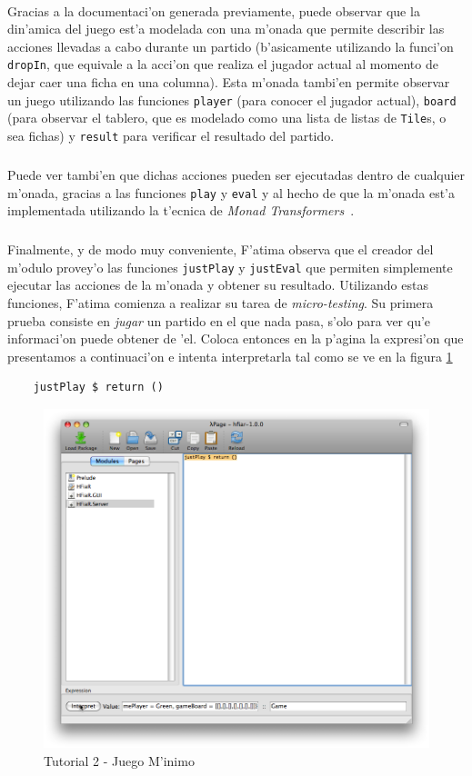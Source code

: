 \documentclass[a4paper]{article}
\begin{document}
\paragraph{}Gracias a la documentaci'on generada previamente, puede observar que la din'amica del juego est'a modelada con una m'onada que permite describir las acciones llevadas a cabo durante un partido (b'asicamente utilizando la funci'on \texttt{dropIn}, que equivale a la acci'on que realiza el jugador actual al momento de dejar caer una ficha en una columna).  Esta m'onada tambi'en permite observar un juego utilizando las funciones \texttt{player} (para conocer el jugador actual), \texttt{board} (para observar el tablero, que es modelado como una lista de listas de \texttt{Tile}s, o sea fichas) y \texttt{result} para verificar el resultado del partido.
\subparagraph{}Puede ver tambi'en que dichas acciones pueden ser ejecutadas dentro de cualquier m'onada, gracias a las funciones \texttt{play} y \texttt{eval} y al hecho de que la m'onada est'a implementada utilizando la t'ecnica de \textsl{Monad Transformers}~\cite{realworldhaskell}.
\subparagraph{}Finalmente, y de modo muy conveniente, F'atima observa que el creador del m'odulo provey'o las funciones \texttt{justPlay} y \texttt{justEval} que permiten simplemente ejecutar las acciones de la m'onada y obtener su resultado.  Utilizando estas funciones, F'atima comienza a realizar su tarea de \textsl{micro-testing}.  Su primera prueba consiste en \textit{jugar} un partido en el que nada pasa, s'olo para ver qu'e informaci'on puede obtener de 'el.  Coloca entonces en la p'agina la expresi'on que presentamos a continuaci'on e intenta interpretarla tal como se ve en la figura \ref{tut205}
\lstset{language=haskell, frame=single, tabsize=4}
\begin{center}\begin{lstlisting}
	justPlay $ return ()
\end{lstlisting}\end{center}
\begin{figure}[hp]
	\begin{center}
        	\includegraphics[width=.75\textwidth]{pictures/tut2/05}
		\caption{Tutorial 2 - Juego M'inimo}
		\label{tut205}
	\end{center}
\end{figure}
\end{document}
